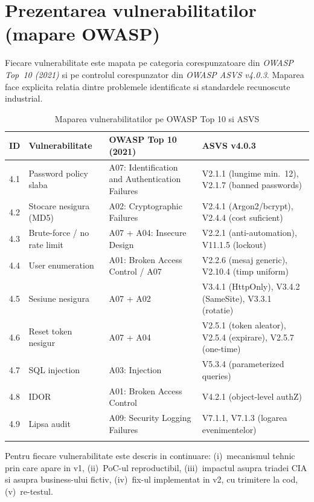 \documentclass[12pt,a4paper]{article}
\begin{document}
\newpage
\section{Prezentarea vulnerabilitatilor (mapare OWASP)}\label{sec:vuln}

Fiecare vulnerabilitate este mapata pe categoria corespunzatoare din
\textit{OWASP Top~10 (2021)} si pe controlul corespunzator din
\textit{OWASP ASVS v4.0.3}. Maparea face explicita relatia dintre
problemele identificate si standardele recunoscute industrial.

\begin{longtable}{p{} p{} p{} p{}}
\toprule
\textbf{ID} & \textbf{Vulnerabilitate} & \textbf{OWASP Top 10 (2021)} & \textbf{ASVS v4.0.3} \\
\midrule
\endhead
4.1 & Password policy slaba & A07: Identification and Authentication Failures & V2.1.1 (lungime min.~12), V2.1.7 (banned passwords) \\
4.2 & Stocare nesigura (MD5) & A02: Cryptographic Failures & V2.4.1 (Argon2/bcrypt), V2.4.4 (cost suficient) \\
4.3 & Brute-force / no rate limit & A07 + A04: Insecure Design & V2.2.1 (anti-automation), V11.1.5 (lockout) \\
4.4 & User enumeration & A01: Broken Access Control / A07 & V2.2.6 (mesaj generic), V2.10.4 (timp uniform) \\
4.5 & Sesiune nesigura & A07 + A02 & V3.4.1 (HttpOnly), V3.4.2 (SameSite), V3.3.1 (rotatie) \\
4.6 & Reset token nesigur & A07 + A04 & V2.5.1 (token aleator), V2.5.4 (expirare), V2.5.7 (one-time) \\
4.7 & SQL injection & A03: Injection & V5.3.4 (parameterized queries) \\
4.8 & IDOR & A01: Broken Access Control & V4.2.1 (object-level authZ) \\
4.9 & Lipsa audit & A09: Security Logging Failures & V7.1.1, V7.1.3 (logarea evenimentelor) \\
\bottomrule
\caption{Maparea vulnerabilitatilor pe OWASP Top 10 si ASVS}
\label{tab:owasp}
\end{longtable}

Pentru fiecare vulnerabilitate este descris in continuare:
(i)~mecanismul tehnic prin care apare in v1, (ii)~PoC-ul reproductibil,
(iii)~impactul asupra triadei CIA si asupra business-ului fictiv,
(iv)~fix-ul implementat in v2, cu trimitere la cod, (v)~re-testul.
\end{document}
